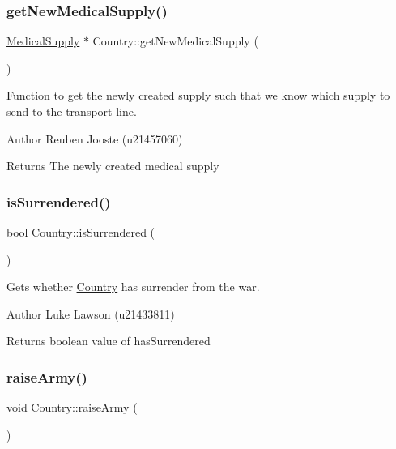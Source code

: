 \subsubsection{\texorpdfstring{getNewMedicalSupply()}{getNewMedicalSupply()}}
{\footnotesize\ttfamily \mbox{\hyperlink{class_medical_supply}{Medical\+Supply}} $\ast$ Country\+::get\+New\+Medical\+Supply (\begin{DoxyParamCaption}{ }\end{DoxyParamCaption})}



Function to get the newly created supply such that we know which supply to send to the transport line. 

\begin{DoxyAuthor}{Author}
Reuben Jooste (u21457060) 
\end{DoxyAuthor}
\begin{DoxyReturn}{Returns}
The newly created medical supply 
\end{DoxyReturn}
\mbox{\label{class_country_a5bef51b05acceb350babfd766f2f9752}} 
\subsubsection{\texorpdfstring{isSurrendered()}{isSurrendered()}}
{\footnotesize\ttfamily bool Country\+::is\+Surrendered (\begin{DoxyParamCaption}{ }\end{DoxyParamCaption})}



Gets whether \mbox{\hyperlink{class_country}{Country}} has surrender from the war. 

\begin{DoxyAuthor}{Author}
Luke Lawson (u21433811) 
\end{DoxyAuthor}
\begin{DoxyReturn}{Returns}
boolean value of has\+Surrendered 
\end{DoxyReturn}
\mbox{\label{class_country_a41ad154bf05464bf47c7e12d6e25a30e}} 
\subsubsection{\texorpdfstring{raiseArmy()}{raiseArmy()}}
{\footnotesize\ttfamily void Country\+::raise\+Army (\begin{DoxyParamCaption}{ }\end{DoxyParamCaption})}



